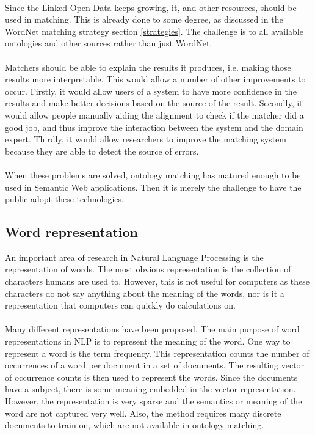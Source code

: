 \documentclass{article}
\begin{document}
 \paragraph{}
 Since the Linked Open Data keeps growing, it, and other resources, should be used in matching. This is already done to some degree, as discussed in the WordNet matching strategy section \ref{strategies}. The challenge is to all available ontologies and other sources rather than just WordNet.
 \paragraph{}
 Matchers should be able to explain the results it produces, i.e. making those results more interpretable. This would allow a number of other improvements to occur. Firstly, it would allow users of a system to have more confidence in the results and make better decisions based on the source of the result. Secondly, it would allow people manually aiding the alignment to check if the matcher did a good job, and thus improve the interaction between the system and the domain expert. Thirdly, it would allow researchers to improve the matching system because they are able to detect the source of errors.
 \paragraph{}
 When these problems are solved, ontology matching has matured enough to be used in Semantic Web applications. Then it is merely the challenge to have the public adopt these technologies.
 
 \subsection{Word representation} \label{w2v}
 An important area of research in Natural Language Processing is the representation of words. The most obvious representation is the collection of characters humans are used to. However, this is not useful for computers as these characters do not say anything about the meaning of the words, nor is it a representation that computers can quickly do calculations on.
 \paragraph{}
 Many different representations have been proposed. The main purpose of word representations in NLP is to represent the meaning of the word. One way to represent a word is the term frequency. This representation counts the number of occurrences of a word per document in a set of documents. The resulting vector of occurrence counts is then used to represent the words. Since the documents have a subject, there is some meaning embedded in the vector representation. However, the representation is very sparse and the semantics or meaning of the word are not captured very well. Also, the method requires many discrete documents to train on, which are not available in ontology matching.
\end{document}
